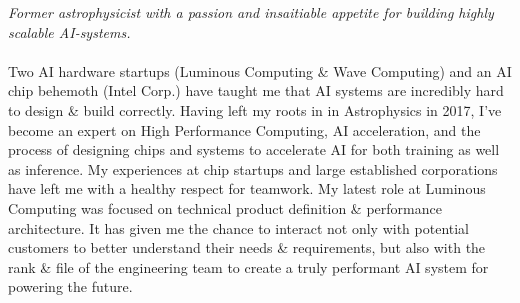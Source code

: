 \documentclass[10pt,a4paper]{article}
\begin{document}
\vspace{-1.3em}  %
\begin{multicols}{2}  %
\noindent \emph{Former astrophysicist with a passion and insaitiable appetite for building highly scalable AI-systems.}
\\
\\
Two AI hardware startups (Luminous Computing \& Wave Computing) and an AI chip behemoth (Intel Corp.) have taught me that AI systems are incredibly hard to design \& build correctly. Having left my roots in in Astrophysics in 2017, I've become an expert on High Performance Computing, AI acceleration, and the process of designing chips and systems to accelerate AI for both training as well as inference. My experiences at chip startups and large established corporations have left me with a healthy respect for teamwork. My latest role at Luminous Computing was focused on technical product definition \& performance architecture. It has given me the chance to interact not only with potential customers to better understand their needs \& requirements, but also with the rank \& file of the engineering team to create a truly performant AI system for powering the future. 






\end{multicols}
\end{document}
